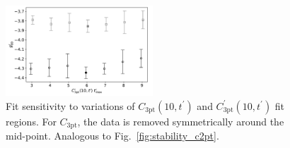 \documentclass[prd,aps,twocolumn,superscriptaddress,tightenlines,nofootinbib,floatfix,preprintnumbers,10pt]{revtex4-1}
\begin{document}
\begin{figure}[h]
{		\includegraphics[width=0.49\textwidth]{plots/figures/3296_dgV10_tmax_dgV.pdf}
		\caption{
			Fit sensitivity to variations of $C_{\mathrm{3pt}}(10,t^\prime)$ and $C^\prime_{\mathrm{3pt}}(10,t^\prime)$ fit regions. For $C_{\mathrm{3pt}}$, the data is removed symmetrically around the mid-point. Analogous to Fig.~\ref{fig:stability_c2pt}.}
		\label{fig:stability_c3pt10}
}\end{figure}
\end{document}
